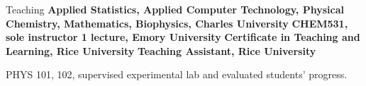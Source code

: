 \begin{rubric}{Teaching}
%
\entry*[\hspace{1.05cm}2023]%
  \textbf{Applied Statistics, Applied Computer Technology, Physical Chemistry, Mathematics, Biophysics, Charles University}
\entry*[\hspace{1.05cm}2021]%
  \textbf{CHEM531, sole instructor 1 lecture, Emory University}
\entry*[\hspace{1.05cm}2020]%
  \textbf{Certificate in Teaching and Learning, Rice University}
\entry*[2015 -- 2016]%
  \textbf{Teaching Assistant, Rice University}
  \par PHYS 101, 102, supervised experimental lab and evaluated students' progress.
\end{rubric}
